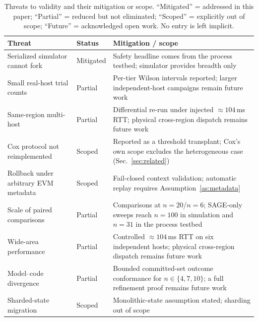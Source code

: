 \documentclass[journal]{IEEEtran}
\theoremstyle{definition}
\theoremstyle{remark}
\begin{document}
\begin{table}[t]
\centering
\caption{Threats to validity and their mitigation or scope. ``Mitigated'' = addressed in
this paper; ``Partial'' = reduced but not eliminated; ``Scoped'' = explicitly out of scope; ``Future'' = acknowledged
open work. No entry is left implicit.}
\label{tab:threats}
\setlength{\tabcolsep}{6pt}
\renewcommand{\arraystretch}{1.3}
\footnotesize
\begin{tabular}{p{}p{}p{}}
\toprule
Threat & Status & Mitigation / scope \\
\midrule
Serialized simulator cannot fork & Mitigated & Safety headline comes from the process testbed; simulator provides breadth only \\
Small real-host trial counts & Partial & Per-tier Wilson intervals reported; larger independent-host campaigns remain future work \\
Same-region multi-host & Partial & Differential re-run under injected $\approx104$\,ms RTT; physical cross-region dispatch remains future work \\
Cox protocol not reimplemented & Scoped & Reported as a threshold transplant; Cox's own scope excludes the heterogeneous case (Sec.~\ref{sec:related}) \\
Rollback under arbitrary EVM metadata & Scoped & Fail-closed context validation; automatic replay requires Assumption~\ref{as:metadata} \\
Scale of paired comparisons & Partial & Comparisons at $n{=}20$/$n{=}6$; SAGE-only sweeps reach $n{=}100$ in simulation and $n{=}31$ in the process testbed \\
Wide-area performance & Partial & Controlled ${\approx}104$\,ms RTT on six independent hosts; physical cross-region dispatch remains future work \\
Model--code divergence & Partial & Bounded committed-set outcome conformance for $n\in\{4,7,10\}$; a full refinement proof remains future work \\
Sharded-state migration & Scoped & Monolithic-state assumption stated; sharding out of scope \\
\bottomrule
\end{tabular}
\end{table}
\end{document}
